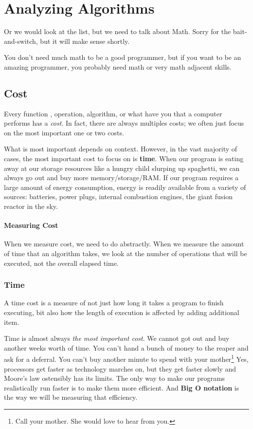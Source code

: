 \chapter{Analyzing Algorithms}
\label{chap:analysis}
Or we would look at the list, but we need to talk about Math.  Sorry for the bait-and-switch, but it will make sense shortly.

You don't need much math to be a good programmer, but if you want to be an amazing programmer, you probably need math or very math adjacent skills.



\section{Cost}
Every function , operation, algorithm, or what have you that a computer performs has a \emph{cost}. 
In fact, there are always multiples costs;  we often just focus on the most important one or two costs.  

What is most important depends on context.
However, in the vast majority of cases, the most important cost to focus on is \textbf{time}.
When our program is eating away at our storage resources like a hungry child slurping up spaghetti, we can always go out and buy more memory/storage/RAM.
If our program requires a large amount of energy consumption, energy is readily available from a variety of sources: batteries, power plugs, internal combustion engines, the giant fusion reactor in the sky.


\subsubsection*{Measuring Cost}
When we measure cost, we need to do abstractly.  
When we measure the amount of time that an algorithm takes, we look at the number of operations that will be executed, not the overall elapsed time.

\subsection{Time}
A time cost is a measure of not just how long it takes a program to finish executing, bit also how the length of execution is affected by adding additional item.

Time is almost always \emph{the most important cost}. We cannot got out and buy another weeks worth of time.  You can't hand a bunch of money to the reaper and ask for a deferral. You can't buy another minute to spend with your mother\footnote{Call your mother.  She would love to hear from you.} 
Yes, processors get faster as technology marches on, but they get faster slowly and Moore's law ostensibly has its limits.
The only way to make our programs realistically run faster is to make them more efficient.  And \textbf{Big O notation} is the way we will be measuring that efficiency.


